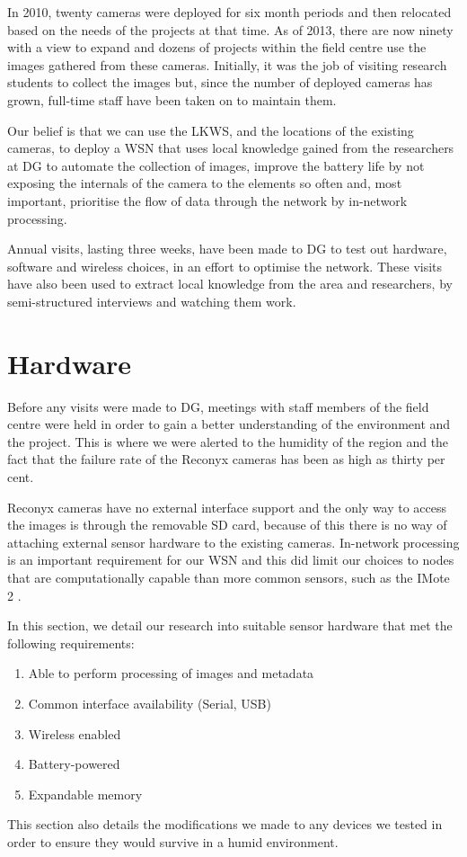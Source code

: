 In 2010, twenty cameras were deployed for six month periods and then relocated based on the needs of the projects at that time. As of 2013, there are now ninety with a view to expand and dozens of projects within the field centre use the images gathered from these cameras. Initially, it was the job of visiting research students to collect the images but, since the number of deployed cameras has grown, full-time staff have been taken on to maintain them.

Our belief is that we can use the LKWS, and the locations of the existing cameras, to deploy a WSN that uses local knowledge gained from the researchers at DG to automate the collection of images, improve the battery life by not exposing the internals of the camera to the elements so often and, most important, prioritise the flow of data through the network by in-network processing. 
	
Annual visits, lasting three weeks, have been made to DG to test out hardware, software and wireless choices, in an effort to optimise the network. These visits have also been used to extract local knowledge from the area and researchers, by semi-structured interviews and watching them work.

\section{Hardware}\label{tech:hw}
	Before any visits were made to DG, meetings with staff members of the field centre were held in order to gain a better understanding of the environment and the project. This is where we were alerted to the humidity of the region and the fact that the failure rate of the Reconyx cameras has been as high as thirty per cent.

Reconyx cameras have no external interface support and the only way to access the images is through the removable SD card, because of this there is no way of attaching external sensor hardware to the existing cameras. In-network processing is an important requirement for our WSN and this did limit our choices to nodes that are computationally capable than more common sensors, such as the IMote 2 \cite{Nachman2008}.

In this section, we detail our research into suitable sensor hardware that met the following requirements:
\begin{enumerate}
	\item Able to perform processing of images and metadata
	\item Common interface availability (Serial, USB)
	\item Wireless enabled
	\item Battery-powered
	\item Expandable memory
\end{enumerate}
This section also details the modifications we made to any devices we tested in order to ensure they would survive in a humid environment.

